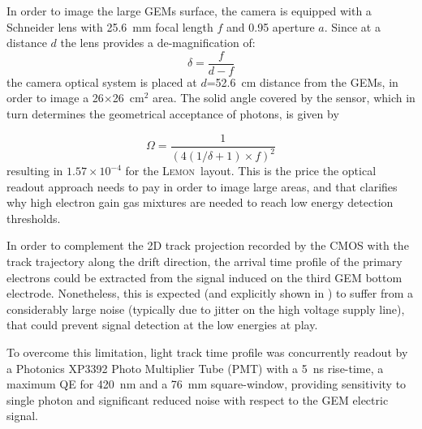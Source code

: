 \documentclass[physics,article,submit,moreauthors,pdftex]{Definitions/mdpi}
\newcommand{\lemon}{{\textsc{Lemon}}\xspace}
\begin{document}
In order to image the large GEMs surface, the camera is equipped with a Schneider lens with 25.6~mm focal length $f$ and 0.95 aperture $a$. Since at a distance $d$ the lens provides a de-magnification of:
\begin{equation}
\label{eq:demagnification}
 \delta = \frac{f}{d-f} 
\end{equation}
the camera optical system is placed at $d$=52.6~cm distance from the GEMs, in order to image a 26$\times$26~cm$^2$ area. The solid angle covered by the sensor, which in turn determines the geometrical acceptance of photons, is given by

$$
\label{eq:omega}
\Omega = \frac{1}{\left(4(1/\delta+1)\times f \right)^2}
$$
resulting in $1.57 \times 10^{-4}$ for the \lemon\ layout. This is the price the optical readout approach needs to pay in order to image large areas, and that clarifies why high electron gain gas mixtures are needed to reach low energy detection thresholds.





In order to complement the 2D track projection recorded by the CMOS with the track trajectory along the drift direction, the arrival time profile of the primary electrons could be extracted from the signal induced on the third GEM bottom electrode. Nonetheless, this is expected (and explicitly shown in \cite{bib:jinst_orange2}) to suffer from a considerably large 
noise (typically due to jitter on the high voltage
supply line), that could prevent signal detection at the low energies at play.

To overcome this limitation, light track time profile was concurrently readout by a Photonics XP3392 Photo Multiplier Tube (PMT) with a 5~ns rise-time, a maximum QE for 420~nm and a 76~mm square-window, providing sensitivity to single photon and significant reduced noise with respect to the GEM electric signal. 

\end{document}
